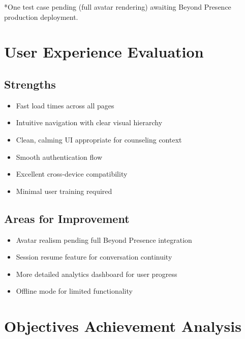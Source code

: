 \documentclass[11pt,a4paper]{report}
\begin{document}
*One test case pending (full avatar rendering) awaiting Beyond Presence production deployment.

\section{User Experience Evaluation}

\subsection{Strengths}
\begin{itemize}
    \item Fast load times across all pages
    \item Intuitive navigation with clear visual hierarchy
    \item Clean, calming UI appropriate for counseling context
    \item Smooth authentication flow
    \item Excellent cross-device compatibility
    \item Minimal user training required
\end{itemize}

\subsection{Areas for Improvement}
\begin{itemize}
    \item Avatar realism pending full Beyond Presence integration
    \item Session resume feature for conversation continuity
    \item More detailed analytics dashboard for user progress
    \item Offline mode for limited functionality
\end{itemize}

\section{Objectives Achievement Analysis}
\end{document}
